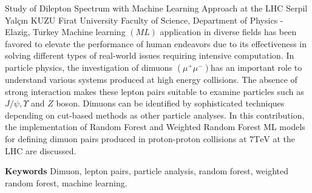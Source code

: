 
    \begin{abstract_online}{Study of Dilepton Spectrum with Machine Learning Approach at the LHC}{%
        Serpil Yalçın KUZU}{%
        }{%
        Firat University Faculty of Science, Department of Physics - Elazig, Turkey}
    Machine learning $(M L)$ application in diverse fields has been favored to elevate the performance of human endeavors due to its effectiveness in solving different types of real-world issues requiring intensive computation. In particle physics, the investigation of dimuons $\left(\mu^{+} \mu^{-}\right)$has an important role to understand various systems produced at high energy collisions. The absence of strong interaction makes these lepton pairs suitable to examine particles such as $J / \psi, \Upsilon$ and $Z$ boson. Dimuons can be identified by sophisticated techniques depending on cut-based methods as other particle analyses. In this contribution, the implementation of Random Forest and Weighted Random Forest ML models for defining dimuon pairs produced in proton-proton collisions at $7 \mathrm{TeV}$ at the LHC are discussed. 
    
        \textbf{Keywords} \newline{}Dimuon, lepton pairs, particle analysis, random forest, weighted random forest, machine learning.
    \end{abstract_online}
    